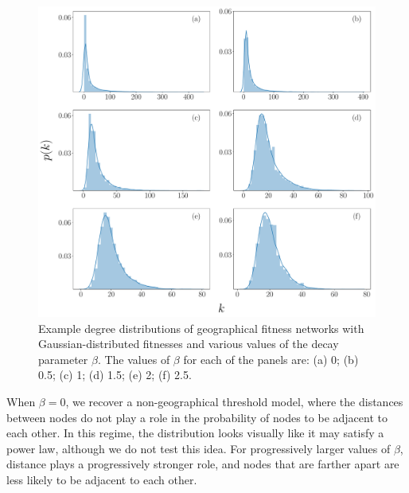 \documentclass[%
 reprint,
 amsmath,amssymb,
 aps,
]{revtex4-1}
\begin{document}
\begin{figure}
    \centering
    \includegraphics[width=0.7\linewidth]{geographical_degree_distribution3.pdf}
    \caption{Example degree distributions of geographical fitness networks with Gaussian-distributed fitnesses and various values of the decay parameter $\beta$. The values of $\beta$ for each of the panels are: (a) 0; (b) 0.5; (c) 1; (d) 1.5; (e) 2; (f) 2.5.
    }
\end{figure}


When $\beta = 0$, we recover a non-geographical threshold model, where the distances between nodes do not play a role in the probability of nodes to be adjacent to each other. In this regime, the distribution looks visually like it may satisfy a power law, although we do not test this idea. For progressively larger values of $\beta$, distance plays a progressively stronger role, and nodes that are farther apart are less likely to be adjacent to each other.
\end{document}
